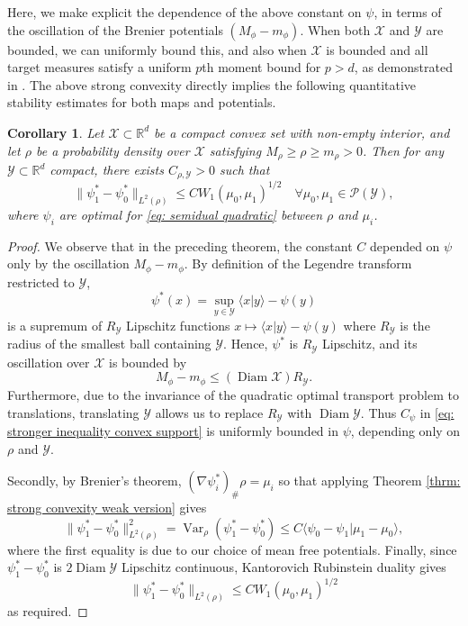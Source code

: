 \documentclass[11pt, oneside, titlepage]{book}
\theoremstyle{plain}
\newtheorem{corollary}{Corollary}[theorem]
\theoremstyle{definition}
\newcommand{\R}{\mathbb{R}}
\newcommand{\X}{\mathcal{X}}
\newcommand{\Y}{\mathcal{Y}}
\DeclareMathOperator{\var}{Var}
\DeclareMathOperator{\diam}{Diam}
\begin{document}
Here, we make explicit the dependence of the above constant on $\psi$, in terms of the oscillation of the Brenier potentials $(M_\phi - m_\phi)$. When both $\X$ and $\Y$ are bounded, we can uniformly bound this, and also when $\X$ is bounded and all target measures satisfy a uniform $p$th moment bound for $p>d$, as demonstrated in \cite{berman2021convergence, delalande2023quantitative}. The above strong convexity directly implies the following quantitative stability estimates for both maps and potentials.
\begin{corollary} \textnormal{\cite{delalande2023quantitative}}
\label{corr: Potential stability source convex}
    Let $\X \subset \R^d$ be a compact convex set with non-empty interior, and let $\rho$ be a probability density over $\X$ satisfying $M_\rho \geq \rho \geq m_\rho >0$. Then for any $\Y \subset \R^d$ compact, there exists $C_{\rho, \Y} > 0$ such that
    \begin{equation}
        \| \psi^*_1 - \psi^*_0\|_{L^2(\rho)} \leq C W_1(\mu_0, \mu_1)^{1/2} \quad \forall \mu_0, \mu_1 \in \mathcal{P}(\Y),
    \end{equation}
    where $\psi_i$ are optimal for \eqref{eq: semidual quadratic} between $\rho$ and $\mu_i$.
\end{corollary}
\begin{proof}
    We observe that in the preceding theorem, the constant $C$ depended on $\psi$ only by the oscillation $M_\phi - m_\phi$. By definition of the Legendre transform restricted to $\Y$,
    \begin{equation*}
        \psi^*(x) = \sup_{y \in \Y} \langle x | y \rangle - \psi(y)
    \end{equation*}
    is a supremum of $R_\Y$ Lipschitz functions $x \mapsto \langle x | y \rangle - \psi(y)$ where $R_\Y$ is the radius of the smallest ball containing $\Y$. Hence, $\psi^*$ is $R_\Y$ Lipschitz, and its oscillation over $\X$ is bounded by
    \begin{equation*}
        M_\phi - m_\phi \leq (\diam \X) R_\Y.
    \end{equation*}
    Furthermore, due to the invariance of the quadratic optimal transport problem to translations, translating $\Y$ allows us to replace $R_\Y$ with $\diam \Y$. Thus $C_\psi$ in \eqref{eq: stronger inequality convex support} is uniformly bounded in $\psi$, depending only on $\rho$ and $\Y$.

    Secondly, by Brenier's theorem, $(\nabla \psi_i^*)_{\#}\rho = \mu_i$ so that applying Theorem \ref{thrm: strong convexity weak version} gives
    \begin{equation*}
        \| \psi^*_1 - \psi_0^*\|_{L^2(\rho)}^2 = \var_\rho(\psi^*_1 - \psi_0^*) \leq C \langle \psi_0 - \psi_1 | \mu_1 - \mu_0 \rangle,
    \end{equation*}
    where the first equality is due to our choice of mean free potentials. Finally, since $\psi_1^* - \psi_0^*$ is $2 \diam \Y$ Lipschitz continuous, Kantorovich Rubinstein duality gives
    \begin{equation*}
        \| \psi^*_1 - \psi_0^*\|_{L^2(\rho)} \leq C W_1(\mu_0, \mu_1)^{1/2}
    \end{equation*}
    as required.
\end{proof}
\end{document}
